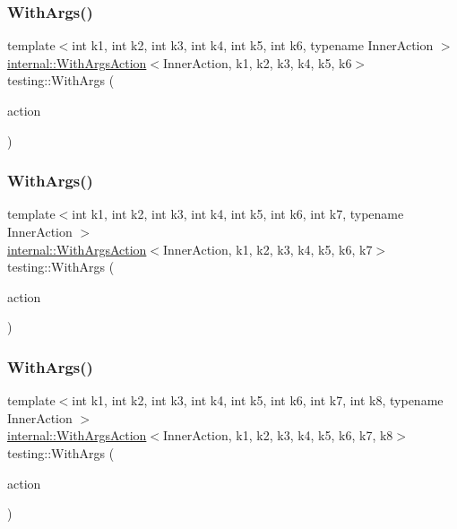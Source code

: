 \subsubsection{\texorpdfstring{WithArgs()}{WithArgs()}\hspace{0.1cm}{\footnotesize\ttfamily [6/11]}}
{\footnotesize\ttfamily template$<$int k1, int k2, int k3, int k4, int k5, int k6, typename Inner\+Action $>$ \\
\mbox{\hyperlink{structtesting_1_1internal_1_1_with_args_action}{internal\+::\+With\+Args\+Action}}$<$Inner\+Action, k1, k2, k3, k4, k5, k6$>$ testing\+::\+With\+Args (\begin{DoxyParamCaption}\item[{const Inner\+Action \&}]{action }\end{DoxyParamCaption})\hspace{0.3cm}{\ttfamily [inline]}}

\mbox{\label{namespacetesting_a04146a27847141c6942e9c67a85aadbe}} 
\subsubsection{\texorpdfstring{WithArgs()}{WithArgs()}\hspace{0.1cm}{\footnotesize\ttfamily [7/11]}}
{\footnotesize\ttfamily template$<$int k1, int k2, int k3, int k4, int k5, int k6, int k7, typename Inner\+Action $>$ \\
\mbox{\hyperlink{structtesting_1_1internal_1_1_with_args_action}{internal\+::\+With\+Args\+Action}}$<$Inner\+Action, k1, k2, k3, k4, k5, k6, k7$>$ testing\+::\+With\+Args (\begin{DoxyParamCaption}\item[{const Inner\+Action \&}]{action }\end{DoxyParamCaption})\hspace{0.3cm}{\ttfamily [inline]}}

\mbox{\label{namespacetesting_a16c131c0d58ae07d2e1ee6c7a44aaad1}} 
\subsubsection{\texorpdfstring{WithArgs()}{WithArgs()}\hspace{0.1cm}{\footnotesize\ttfamily [8/11]}}
{\footnotesize\ttfamily template$<$int k1, int k2, int k3, int k4, int k5, int k6, int k7, int k8, typename Inner\+Action $>$ \\
\mbox{\hyperlink{structtesting_1_1internal_1_1_with_args_action}{internal\+::\+With\+Args\+Action}}$<$Inner\+Action, k1, k2, k3, k4, k5, k6, k7, k8$>$ testing\+::\+With\+Args (\begin{DoxyParamCaption}\item[{const Inner\+Action \&}]{action }\end{DoxyParamCaption})\hspace{0.3cm}{\ttfamily [inline]}}

